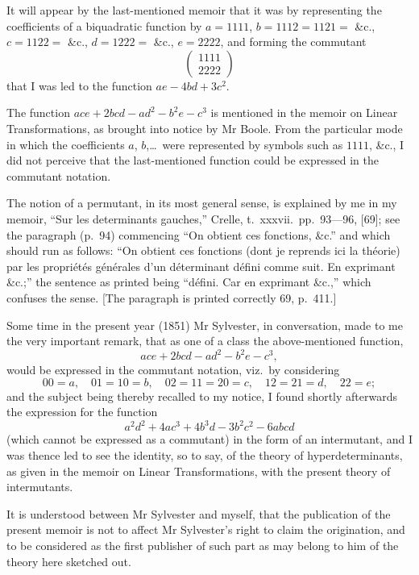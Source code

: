 \documentclass[11pt,a4paper]{book}
\begin{document}
It will appear by the last-mentioned memoir that it was by representing the coefficients of a biquadratic function by $a = 1111$, $b = 1112 = 1121 =$ \&c., $c = 1122 =$ \&c., $d = 1222 =$ \&c., $e = 2222$, and forming the commutant
\[\begin{pmatrix} 1111 \\ 2222 \end{pmatrix}\]
that I was led to the function $ae - 4bd + 3c^2$.

The function $ace + 2bcd - ad^2 - b^2e - c^3$ is mentioned in the memoir on Linear Transformations, as brought into notice by Mr Boole. From the particular mode in which the coefficients $a$, $b$,\ldots\ were represented by symbols such as $1111$, \&c., I did not perceive that the last-mentioned function could be expressed in the commutant notation.

The notion of a permutant, in its most general sense, is explained by me in my memoir, ``Sur les determinants gauches,'' Crelle, t.\ xxxvii.\ pp.\ 93---96, [69]; see the paragraph (p.\ 94) commencing ``On obtient ces fonctions, \&c.'' and which should run as follows: ``On obtient ces fonctions (dont je reprends ici la th\'{e}orie) par les propri\'{e}t\'{e}s g\'{e}n\'{e}rales d'un d\'{e}terminant d\'{e}fini comme suit. En exprimant \&c.;'' the sentence as printed being ``d\'{e}fini. Car en exprimant \&c.,'' which confuses the sense. [The paragraph is printed correctly 69, p.\ 411.]

Some time in the present year (1851) Mr Sylvester, in conversation, made to me the very important remark, that as one of a class the above-mentioned function,
\[ace + 2bcd - ad^2 - b^2e - c^3,\]
would be expressed in the commutant notation, viz.\ by considering
\[00 = a, \quad 01 = 10 = b, \quad 02 = 11 = 20 = c, \quad 12 = 21 = d, \quad 22 = e;\]
and the subject being thereby recalled to my notice, I found shortly afterwards the expression for the function
\[a^2d^2 + 4ac^3 + 4b^3d - 3b^2c^2 - 6abcd\]
(which cannot be expressed as a commutant) in the form of an intermutant, and I was thence led to see the identity, so to say, of the theory of hyperdeterminants, as given in the memoir on Linear Transformations, with the present theory of intermutants.

It is understood between Mr Sylvester and myself, that the publication of the present memoir is not to affect Mr Sylvester's right to claim the origination, and to be considered as the first publisher of such part as may belong to him of the theory here sketched out.
\clearpage
\end{document}
